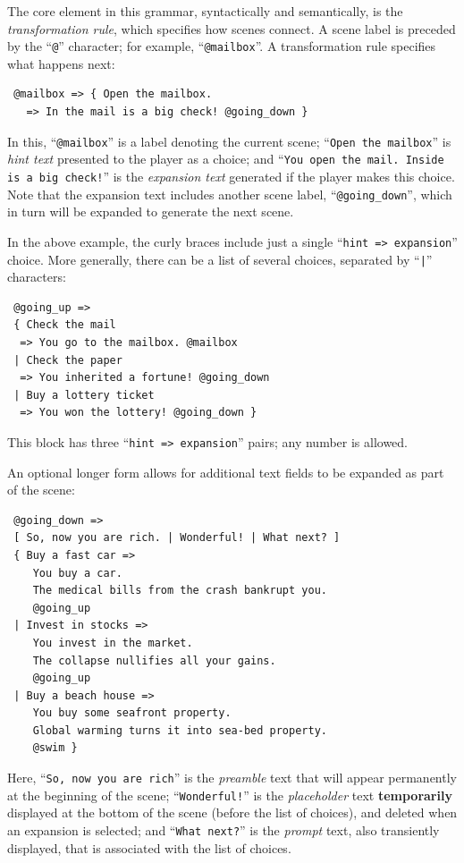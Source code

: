 \documentclass{acm_proc_article-sp}
\begin{document}
The core element in this grammar, syntactically and semantically, is the {\em transformation rule},
which specifies how scenes connect.
A scene label is preceded by the ``{\tt @}'' character;
for example, ``{\tt @mailbox}''.
A transformation rule specifies what happens next:
\begin{verbatim}
 @mailbox => { Open the mailbox.
   => In the mail is a big check! @going_down }
\end{verbatim}
In this, ``{\tt @mailbox}'' is a label denoting the current scene;
``{\tt Open the mailbox}'' is {\em hint text} presented to the player as a choice;
and ``{\tt You open the mail. Inside is a big check!}''
 is the {\em expansion text} generated if the player makes this choice.
 Note that the expansion text includes another scene label, ``{\tt @going\_down}'',
  which in turn will be expanded to generate the next scene.

In the above example, the curly braces include just a single  ``{\tt hint => expansion}'' choice.
More generally, there can be a list of several choices,
separated by ``{\tt |}'' characters:
\begin{verbatim}
 @going_up =>
 { Check the mail
  => You go to the mailbox. @mailbox
 | Check the paper
  => You inherited a fortune! @going_down
 | Buy a lottery ticket
  => You won the lottery! @going_down }
\end{verbatim}
This block has three ``{\tt hint => expansion}'' pairs; any number is allowed.

An optional longer form allows for additional text fields to be expanded as part of the scene:
\begin{verbatim}
 @going_down =>
 [ So, now you are rich. | Wonderful! | What next? ]
 { Buy a fast car =>
    You buy a car.
    The medical bills from the crash bankrupt you.
    @going_up
 | Invest in stocks =>
    You invest in the market.
    The collapse nullifies all your gains.
    @going_up
 | Buy a beach house =>
    You buy some seafront property.
    Global warming turns it into sea-bed property.
    @swim }
\end{verbatim}

Here, ``{\tt So, now you are rich}'' is the {\em preamble} text that will appear permanently at the beginning of the scene;
``{\tt Wonderful!}'' is the {\em placeholder} text {\bf temporarily} displayed at the bottom of the scene (before the list of choices),
and deleted when an expansion is selected;
and ``{\tt What next?}'' is the {\em prompt} text, also transiently displayed, that is associated with the list of choices.
\end{document}
